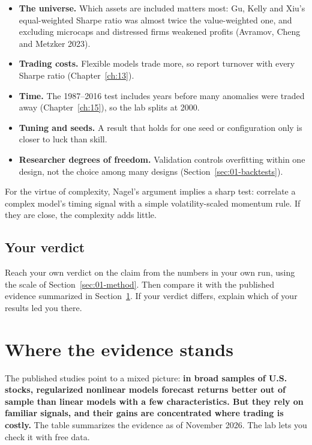 \begin{itemize}
  \item \textbf{The universe.} Which assets are included matters most: Gu, Kelly and Xiu's equal-weighted Sharpe ratio was almost twice the value-weighted one, and excluding microcaps and distressed firms weakened profits (Avramov, Cheng and Metzker 2023).
  \item \textbf{Trading costs.} Flexible models trade more, so report turnover with every Sharpe ratio (Chapter~\ref{ch:13}).
  \item \textbf{Time.} The 1987--2016 test includes years before many anomalies were traded away (Chapter~\ref{ch:15}), so the lab splits at 2000.
  \item \textbf{Tuning and seeds.} A result that holds for one seed or configuration only is closer to luck than skill.
  \item \textbf{Researcher degrees of freedom.} Validation controls overfitting within one design, not the choice among many designs (Section~\ref{sec:01-backtests}).
\end{itemize}

For the virtue of complexity, Nagel's argument implies a sharp test: correlate a complex model's timing signal with a simple volatility-scaled momentum rule. If they are close, the complexity adds little.

\subsection*{Your verdict}

Reach your own verdict on the claim from the numbers in your own run, using the scale of Section~\ref{sec:01-method}. Then compare it with the published evidence summarized in Section~\ref{sec:20-verdict}. If your verdict differs, explain which of your results led you there.

\section{Where the evidence stands}
\label{sec:20-verdict}

The published studies point to a mixed picture: \textbf{in broad samples of U.S. stocks, regularized nonlinear models forecast returns better out of sample than linear models with a few characteristics. But they rely on familiar signals, and their gains are concentrated where trading is costly.} The table summarizes the evidence as of November 2026. The lab lets you check it with free data.

